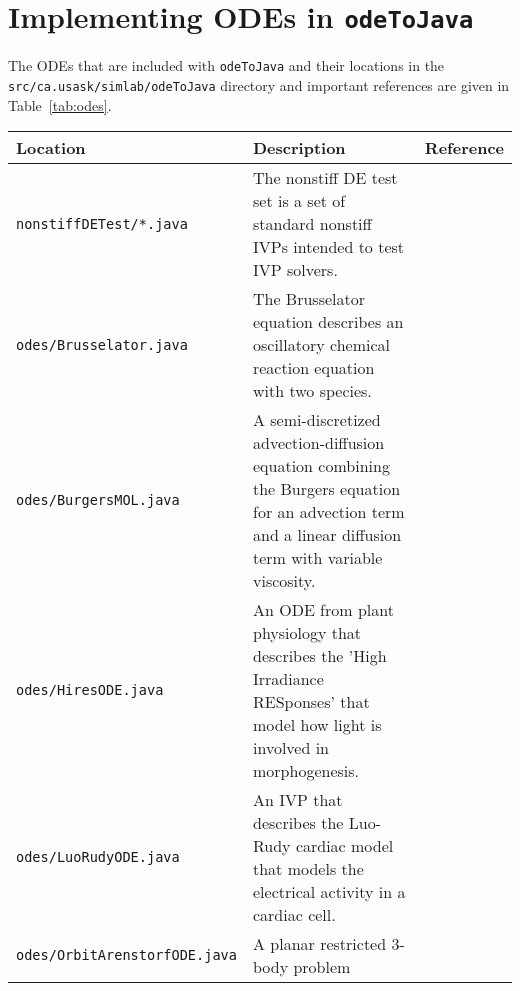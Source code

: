 \documentclass[10pt,letterpaper]{article}
\newcommand\odj{{\tt odeToJava}}
\begin{document}
\section{Implementing ODEs in \odj}

The ODEs that are included with \odj{} and their locations in the {\tt
src/ca.usask/simlab/odeToJava} directory and important references are given in
Table~\ref{tab:odes}.

\begin{table}
\begin{tabular}{|p{2in}|p{2.5in}|p{0.7in}|}
\hline
{\bf Location}                    &  {\bf Description}                                           & {\bf Reference}\\
\hline
\hline
{\tt nonstiffDETest/*.java}       &  The nonstiff DE test set is a set of
                                     standard nonstiff IVPs intended to test
                                     IVP solvers.                                                & \cite{EnrightPryce1987,HullEnrightFellenSedgwick1972} \\
\hline
{\tt odes/Brusselator.java}       &  The Brusselator equation describes an
                                     oscillatory chemical reaction equation
                                     with two species.                                           & \cite{HairerNorsettWanner1993} \\
\hline
{\tt odes/BurgersMOL.java}        &  A semi-discretized advection-diffusion
                                     equation combining the Burgers equation
                                     for an advection term and a linear
                                     diffusion term with variable viscosity.                     & \cite{AscherRuuthSpiteri1997} \\
\hline
{\tt odes/HiresODE.java}          &  An ODE from plant physiology that
                                     describes the 'High Irradiance
                                     RESponses' that model how light is
                                     involved in morphogenesis.                                  & \cite{MazziaMagherini2008} \\
\hline
{\tt odes/LuoRudyODE.java}        &  An IVP that describes the Luo-Rudy
                                     cardiac model that models the
                                     electrical activity in a cardiac cell.                      & \cite{LuoRudy1991} \\
\hline
{\tt odes/OrbitArenstorfODE.java} &  A planar restricted 3-body problem

\end{tabular}
\end{table}
\end{document}
